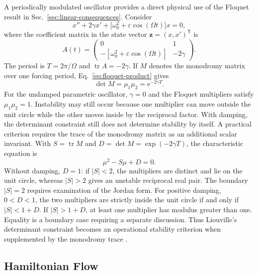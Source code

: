 \documentclass[11pt,a4paper]{article}
\newcommand{\be}{\begin{equation}}
\newcommand{\ee}{\end{equation}}
\newcommand{\lb}[1]{\label{#1}}
\newcommand{\e}{\mathrm{e}}
\DeclareMathOperator{\tr}{tr}
\theoremstyle{definition}
\numberwithin{equation}{section}
\begin{document}
A periodically modulated oscillator provides a direct physical use of the Floquet result in Sec.~\ref{sec:linear-consequences}. Consider
\be
x''+2\gamma x'+\bigl[\omega_0^2+\varepsilon\cos(\Omega t)\bigr]x=0,
\lb{eq:parametric-oscillator}
\ee
where the coefficient matrix in the state vector $\mathbf z=(x,x')^{\mathsf T}$ is
\be
A(t)=
\begin{pmatrix}
0 & 1\\
-[\omega_0^2+\varepsilon\cos(\Omega t)] & -2\gamma
\end{pmatrix}.
\lb{eq:parametric-A}
\ee
The period is $T=2\pi/\Omega$ and $\tr A=-2\gamma$. If $M$ denotes the monodromy matrix over one forcing period, Eq.~\eqref{eq:floquet-product} gives
\be
\det M=\mu_1\mu_2=\e^{-2\gamma T}.
\lb{eq:parametric-multipliers}
\ee
For the undamped parametric oscillator, $\gamma=0$ and the Floquet multipliers satisfy $\mu_1\mu_2=1$. Instability may still occur because one multiplier can move outside the unit circle while the other moves inside by the reciprocal factor. With damping, the determinant constraint still does not determine stability by itself. A practical criterion requires the trace of the monodromy matrix as an additional scalar invariant. With $S=\tr M$ and $D=\det M=\exp(-2\gamma T)$, the characteristic equation is
\be
\mu^2-S\mu+D=0.
\lb{eq:parametric-characteristic}
\ee
Without damping, $D=1$: if $|S|<2$, the multipliers are distinct and lie on the unit circle, whereas $|S|>2$ gives an unstable reciprocal real pair. The boundary $|S|=2$ requires examination of the Jordan form. For positive damping, $0<D<1$, the two multipliers are strictly inside the unit circle if and only if $|S|<1+D$. If $|S|>1+D$, at least one multiplier has modulus greater than one. Equality is a boundary case requiring a separate discussion. Thus Liouville's determinant constraint becomes an operational stability criterion when supplemented by the monodromy trace \cite{yakubovich1975,teschl2012}.

\subsection{Hamiltonian Flow}
\end{document}
